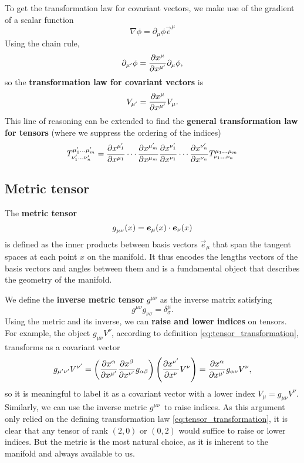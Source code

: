 To get the transformation law for covariant vectors, we make use of the gradient of a scalar function
\begin{equation}
	\nabla \phi = \partial_\mu \phi \vec{e}^\mu 
\end{equation}
Using the chain rule,
\begin{equation}	
	\partial_{\mu'} \phi = \pdv{x^\mu}{x^{\mu'}} \partial_\mu \phi ,
\end{equation}
so the \textbf{transformation law for covariant vectors} is
\begin{equation}
	V_{\mu'} = \pdv{x^{\mu}}{x^{\mu'}} V_\mu .
\end{equation}
This line of reasoning can be extended to find the \textbf{general transformation law for tensors} (where we suppress the ordering of the indices)
\begin{equation}
	T^{\mu_1' \dots \mu_m'}_{\nu_1' \dots \nu_n'} = \pdv{x^{\mu_1'}}{x^{\mu_1}} \cdots \pdv{x^{\mu_m'}}{x^{\mu_m}}
	                                                \pdv{x^{\nu_1'}}{x^{\nu_1}} \cdots \pdv{x^{\nu_n'}}{x^{\nu_n}}
												    T^{\mu_1 \dots \mu_m}_{\nu_1 \dots \nu_n}
\end{equation}
\fi

\subsection{Metric tensor}

The \textbf{metric tensor}
\begin{equation}
	g\indices{_\mu_\nu}(x) = \vec{e}_\mu(x) \cdot \vec{e}_\nu(x)
\end{equation}
is defined as the inner products between basis vectors $\vec{e}_\mu$ that span the tangent spaces at each point $x$ on the manifold.
It thus encodes the lengths vectors of the basis vectors and angles between them and is a fundamental object that describes the geometry of the manifold.

We define the \textbf{inverse metric tensor} $g^{\mu \nu}$ as the inverse matrix satisfying
\begin{equation}
	g^{\mu \nu} g_{\nu \sigma} = \delta^\mu_\sigma .
\end{equation}
Using the metric and its inverse, we can \textbf{raise and lower indices} on tensors.
For example, the object $g_{\mu \nu} V^\nu$, according to definition \eqref{eq:tensor_transformation}, transforms as a covariant vector
\begin{equation}
	g_{\mu' \nu'} V^{\nu'} = \left( \pdv{x^{\alpha}}{x^{\mu'}} \pdv{x^{\beta}}{x^{\nu'}} g_{\alpha \beta} \right) \left( \pdv{x^{\nu'}}{x^{\nu}} V^{\nu} \right) = \pdv{x^{\alpha}}{x^{\mu'}} g_{\alpha \nu} V^\nu ,
\end{equation}
so it is meaningful to label it as a covariant vector with a lower index $V_\mu = g_{\mu \nu} V^\nu$.
Similarly, we can use the inverse metric $g^{\mu \nu}$ to raise indices.
As this argument only relied on the defining transformation law \eqref{eq:tensor_transformation}, it is clear that any tensor of rank $(2,0)$ or $(0,2)$ would suffice to raise or lower indices.
But the metric is the most natural choice, as it is inherent to the manifold and always available to us.

